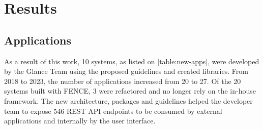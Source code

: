 \chapter{Results}
\label{chap6}

\section{Applications}


As a result of this work, 10 systems, as listed on \autoref{table:new-apps}, were developed by the Glance Team using the proposed guidelines and created libraries. From 2018 to 2023, the number of applications increased from 20 to 27. Of the 20 systems built with FENCE, 3 were refactored and no longer rely on the in-house framework. The new architecture, packages and guidelines helped the developer team to expose 546 REST API endpoints to be consumed by external applications and internally by the user interface.

